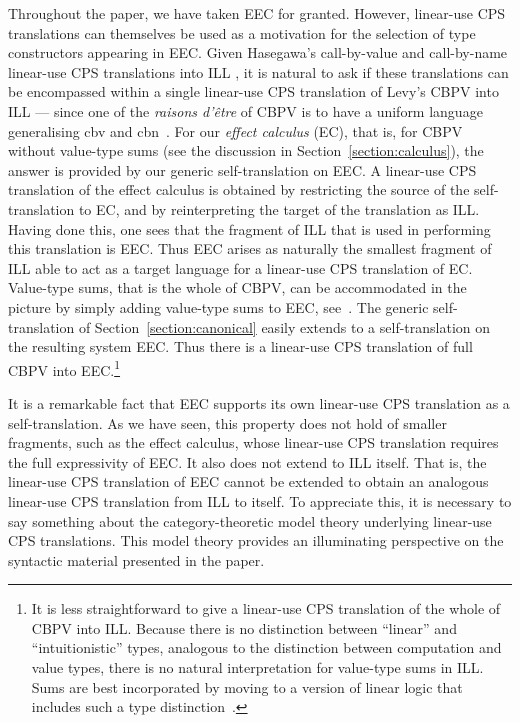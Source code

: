 \documentclass{LMCS}
\begin{document}
Throughout the paper, we have taken EEC for granted. However, linear-use CPS translations
can themselves be used as a motivation for the selection of type constructors 
appearing in EEC. 
Given Hasegawa's call-by-value and call-by-name linear-use CPS translations into ILL
\cite{Hasegawa:Flops:02,Hasegawa:Flops:04}, it is natural to ask if these translations
can be encompassed within a single linear-use CPS translation of Levy's CBPV
into ILL --- since one of the \emph{raisons d'\^{e}tre} of CBPV is to have a uniform 
language generalising cbv and cbn~\cite{Levy:book}. For our \emph{effect calculus} (EC),
that is, for CBPV without value-type sums (see the discussion in 
Section~\ref{section:calculus}), the answer is provided by
our generic self-translation on EEC. A linear-use CPS translation of the effect calculus is obtained by
restricting the source of the self-translation to EC,
and by reinterpreting the target of the translation as ILL.
Having done this, one sees that
the fragment of ILL that is used in performing this translation is EEC.
Thus EEC arises as naturally the smallest fragment of ILL able to act as a target language
for a linear-use CPS translation of EC.
Value-type sums, that is the whole of CBPV, can be accommodated in the picture
by simply adding value-type sums to EEC, see~\cite{EMSb}. The 
generic self-translation of Section~\ref{section:canonical} easily extends
to a self-translation on the resulting system EEC. Thus there is a
linear-use CPS translation of full CBPV into EEC.\footnote{It 
is less straightforward to give a linear-use
CPS translation of the whole of CBPV into ILL. Because there is
no distinction between ``linear'' and ``intuitionistic'' types, analogous
to the distinction between computation and value types, there is no
natural interpretation for  value-type sums in ILL. Sums are best incorporated by
moving to a version of linear logic that includes such a type distinction~\cite{Benton:95}.}

It is a remarkable fact that EEC supports its own linear-use CPS translation as
a self-translation. As we have seen, this property does not hold of smaller 
fragments, such as the effect calculus, whose linear-use CPS translation
requires the full expressivity of EEC.  It also does not extend to ILL
itself. That is, the linear-use CPS translation of EEC cannot be extended to
obtain an analogous linear-use CPS translation from ILL to itself.
To appreciate this, it is necessary to say something about the
category-theoretic model theory underlying linear-use CPS translations.
This model theory provides an illuminating perspective on the 
syntactic material presented in the paper.
\end{document}
